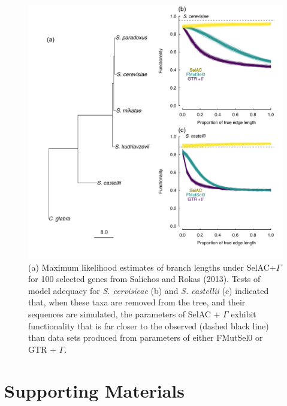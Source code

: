 \documentclass{article}
\begin{document}
\begin{figure}[H]
  \centering
  \includegraphics[width=0.9\linewidth]{FIGURE_3_Inferred_Tree_AND_Model_Adequacy.pdf}
  \caption{(a) Maximum likelihood estimates of branch lengths under SelAC+$\Gamma$ for 100 selected genes from Salichos and Rokas (2013).  
    Tests of model adequacy for \emph{S. cervisieae} (b) and \emph{S. castellii} (c) indicated that, when these taxa are removed from the tree, and their sequences are simulated, the parameters of SelAC + $\Gamma$ exhibit functionality that is far closer to the observed (dashed black line) than data sets produced from parameters of either FMutSel0 or GTR + $\Gamma$.
  } 
  \label{fig:TreeAndAdequacy}
\end{figure}


\clearpage

\setcounter{figure}{0}
\setcounter{table}{0}
\setcounter{page}{1}
\setcounter{section}{0}

\renewcommand{\thefigure}{S\arabic{figure}}
\renewcommand{\thetable}{S\arabic{table}}
\renewcommand{\thepage}{S\arabic{page}}
\renewcommand{\thesection}{\arabic{section}} %


\renewcommand{\appendixname}{Supporting Materials}
\renewcommand{\theequation}{S\arabic{equation}}
\setcounter{equation}{0}
\appendix
\part*{\appendixname}
\end{document}
